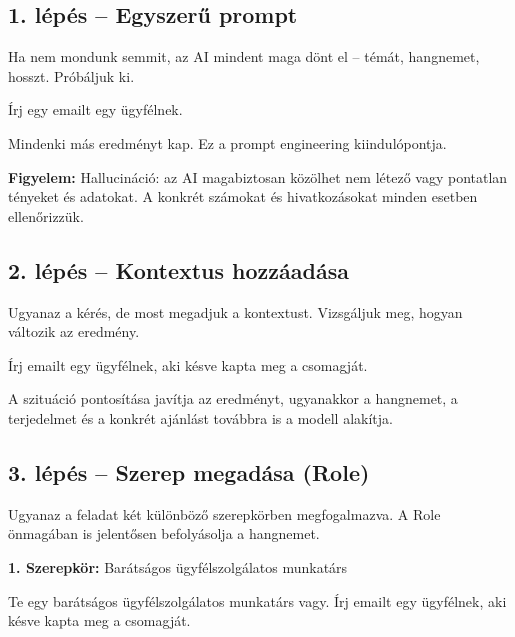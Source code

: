 \documentclass[11pt,a4paper]{article}
\newcommand{\warn}[1]{%
  \vspace{3pt}%
  \begin{tcolorbox}[warnstyle]%
  \textbf{\textcolor{warnborder}{Figyelem:}} #1%
  \end{tcolorbox}\vspace{2pt}}
\begin{document}
\bigskip

\subsection{1. lépés -- Egyszerű prompt}

\noindent Ha nem mondunk semmit, az AI mindent maga dönt el -- témát, hangnemet, hosszt. Próbáljuk ki.

\begin{prompt}
Írj egy emailt egy ügyfélnek.
\end{prompt}

\noindent Mindenki más eredményt kap. Ez a prompt engineering kiindulópontja.

\warn{Hallucináció: az AI magabiztosan közölhet nem létező vagy pontatlan tényeket és adatokat. A konkrét számokat és hivatkozásokat minden esetben ellenőrizzük.}

\subsection{2. lépés -- Kontextus hozzáadása}

\noindent Ugyanaz a kérés, de most megadjuk a kontextust. Vizsgáljuk meg, hogyan változik az eredmény.

\begin{prompt}
Írj emailt egy ügyfélnek, aki késve kapta meg a csomagját.
\end{prompt}

\noindent A szituáció pontosítása javítja az eredményt, ugyanakkor a hangnemet, a terjedelmet és a konkrét ajánlást továbbra is a modell alakítja.

\subsection{3. lépés -- Szerep megadása (Role)}

\noindent Ugyanaz a feladat két különböző szerepkörben megfogalmazva. A Role önmagában is jelentősen befolyásolja a hangnemet.

\medskip\noindent\textbf{1. Szerepkör:} Barátságos ügyfélszolgálatos munkatárs

\begin{prompt}
Te egy barátságos ügyfélszolgálatos munkatárs vagy.
Írj emailt egy ügyfélnek, aki késve kapta meg a csomagját.
\end{prompt}
\end{document}
